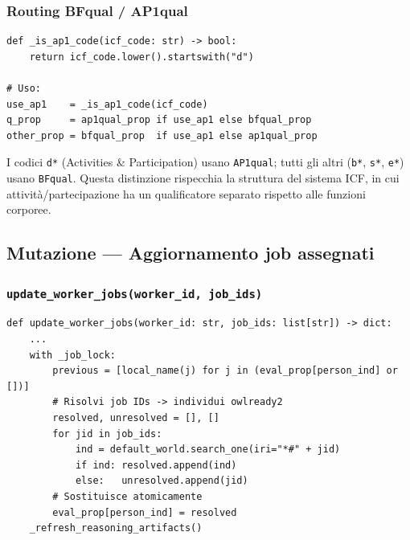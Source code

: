 \documentclass[a4paper,12pt]{article}
\begin{document}
\subsubsection{Routing BFqual / AP1qual}
\vspace{2pt}
\begin{lstlisting}[caption={Routing del qualificatore in base al prefisso ICF.}]
def _is_ap1_code(icf_code: str) -> bool:
    return icf_code.lower().startswith("d")

# Uso:
use_ap1    = _is_ap1_code(icf_code)
q_prop     = ap1qual_prop if use_ap1 else bfqual_prop
other_prop = bfqual_prop  if use_ap1 else ap1qual_prop
\end{lstlisting}

\noindent I codici \texttt{d*} (Activities \& Participation) usano \texttt{AP1qual};
tutti gli altri (\texttt{b*}, \texttt{s*}, \texttt{e*}) usano \texttt{BFqual}.
Questa distinzione rispecchia la struttura del sistema ICF, in cui
attivit\`{a}/partecipazione ha un qualificatore separato rispetto alle
funzioni corporee.

\subsection{Mutazione --- Aggiornamento job assegnati}

\subsubsection{\texttt{update\_\allowbreak{}worker\_\allowbreak{}jobs(worker\_\allowbreak{}id, job\_\allowbreak{}ids)}}

\begin{lstlisting}[caption={Sostituzione atomica dei link isEvaluatedForJob.}]
def update_worker_jobs(worker_id: str, job_ids: list[str]) -> dict:
    ...
    with _job_lock:
        previous = [local_name(j) for j in (eval_prop[person_ind] or [])]
        # Risolvi job IDs -> individui owlready2
        resolved, unresolved = [], []
        for jid in job_ids:
            ind = default_world.search_one(iri="*#" + jid)
            if ind: resolved.append(ind)
            else:   unresolved.append(jid)
        # Sostituisce atomicamente
        eval_prop[person_ind] = resolved
    _refresh_reasoning_artifacts()
\end{lstlisting}
\end{document}
